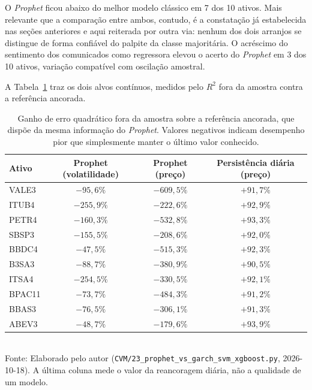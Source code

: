 O \textit{Prophet} ficou abaixo do melhor modelo clássico em 7 dos 10 ativos.
Mais relevante que a comparação entre ambos, contudo, é a constatação já estabelecida nas seções
anteriores e aqui reiterada por outra via: nenhum dos dois arranjos se distingue de forma confiável
do palpite da classe majoritária. O acréscimo do sentimento dos comunicados como regressora elevou o
acerto do \textit{Prophet} em 3 dos 10 ativos, variação compatível com oscilação amostral.

A Tabela~\ref{tab:prophet_continuos} traz os dois alvos contínuos, medidos pelo $R^2$ fora da
amostra contra a referência ancorada.

\begin{table}[htpb]
\centering
\caption{Ganho de erro quadrático fora da amostra sobre a referência ancorada, que dispõe da mesma informação do \textit{Prophet}. Valores negativos indicam desempenho pior que simplesmente manter o último valor conhecido.}
\label{tab:prophet_continuos}
\begin{tabular}{l c c c}
\hline
\textbf{Ativo} & \textbf{Prophet (volatilidade)} & \textbf{Prophet (preço)} & \textbf{Persistência diária (preço)} \\ \hline
VALE3 & $-95{,}6\%$ & $-609{,}5\%$ & $+91{,}7\%$ \\
ITUB4 & $-255{,}9\%$ & $-222{,}6\%$ & $+92{,}9\%$ \\
PETR4 & $-160{,}3\%$ & $-532{,}8\%$ & $+93{,}3\%$ \\
SBSP3 & $-155{,}5\%$ & $-208{,}6\%$ & $+92{,}0\%$ \\
BBDC4 & $-47{,}5\%$ & $-515{,}3\%$ & $+92{,}3\%$ \\
B3SA3 & $-88{,}7\%$ & $-380{,}9\%$ & $+90{,}5\%$ \\
ITSA4 & $-254{,}5\%$ & $-330{,}5\%$ & $+92{,}1\%$ \\
BPAC11 & $-73{,}7\%$ & $-484{,}3\%$ & $+91{,}2\%$ \\
BBAS3 & $-76{,}5\%$ & $-306{,}1\%$ & $+91{,}3\%$ \\
ABEV3 & $-48{,}7\%$ & $-179{,}6\%$ & $+93{,}9\%$ \\
\hline
\end{tabular}
\vspace{0.2cm}
{\small \\ Fonte: Elaborado pelo autor (\texttt{CVM/23\_prophet\_vs\_garch\_svm\_xgboost.py}, 2026-10-18). A última coluna mede o valor da reancoragem diária, não a qualidade de um modelo.}
\end{table}


